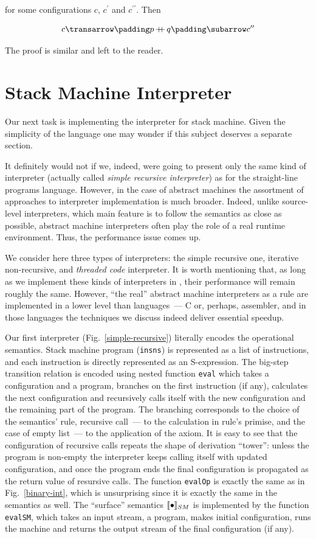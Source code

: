 for some configurations $c$, $c^\prime$ and $c^{\prime\prime}$. Then

\[
\trans{c}{p\dplus q}{c^{\prime\prime}}
\]

The proof is similar and left to the reader.

\section{Stack Machine Interpreter}

Our next task is implementing the interpreter for stack machine. Given the simplicity of the language one may wonder if
this subject deserves a separate section.

It definitely would not if we, indeed, were going to present only the same kind of interpreter (actually called
\emph{simple recursive interpreter}) as for the straight-line programs language. However, in the case of
abstract machines the assortment of approaches to interpreter implementation is much broader. Indeed, unlike source-level interpreters,
which main feature is to follow the semantics as close as possible, abstract machine interpreters often play the role of
a real runtime environment. Thus, the performance issue comes up.

We consider here three types of interpreters: the simple recursive one, iterative non-recursive, and \emph{threaded code} interpreter. It is worth
mentioning that, as long as we implement these kinds of interpreters in \lama, their performance will remain roughly the same. However,
``the real'' abstract machine interpreters as a rule are implemented in a lower level than \lama languages~--- \textsc{C} or, perhaps,
assembler, and in those languages the techniques we discuss indeed deliver essential speedup.

Our first interpreter (Fig.~\ref{simple-recursive}) literally encodes the operational semantics. Stack machine program (\lstinline|insns|) is
represented as a list of instructions, and each instruction is directly represented as an S-expression. The big-step transition relation is
encoded using nested function \lstinline|eval| which takes a configuration and a program, branches on the first instruction 
(if any), calculates the next configuration and recursively calls itself with the new configuration and the remaining
part of the program. The branching corresponds to the choice of the semantics' rule, recursive call~--- to the calculation in rule's
primise, and the case of empty list~--- to the application of the axiom. It is easy to see that the configuration of recursive calls
repeats the shape of derivation ``tower'': unless the program is non-empty the interpreter keeps calling itself with updated
configuration, and once the program ends the final configuration is propagated as the return value of resursive calls. The
function \lstinline|evalOp| is exactly the same as in Fig.~\ref{binary-int}, which is unsurprising since it is exactly the same
in the semantics as well. The ``surface'' semantics $\llbracket{\bullet}\rrbracket_{SM}$ is implemented by the function \lstinline|evalSM|, which
takes an input stream, a program, makes initial configuration, runs the machine and returns the output stream of the final
configuration (if any).


